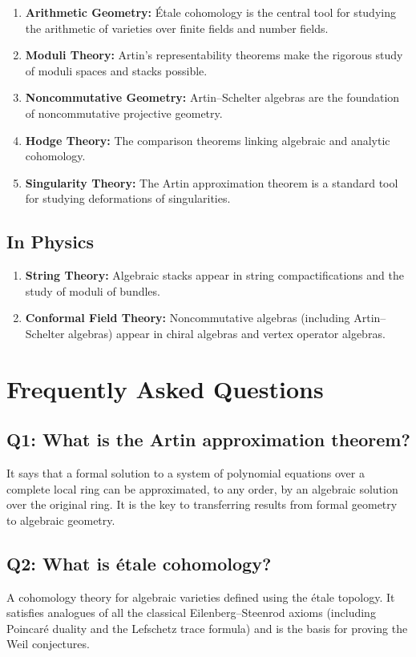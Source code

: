 \begin{enumerate}
    \item \textbf{Arithmetic Geometry:} \'Etale cohomology is the central tool for studying the arithmetic of varieties over finite fields and number fields.
    \item \textbf{Moduli Theory:} Artin's representability theorems make the rigorous study of moduli spaces and stacks possible.
    \item \textbf{Noncommutative Geometry:} Artin--Schelter algebras are the foundation of noncommutative projective geometry.
    \item \textbf{Hodge Theory:} The comparison theorems linking algebraic and analytic cohomology.
    \item \textbf{Singularity Theory:} The Artin approximation theorem is a standard tool for studying deformations of singularities.
\end{enumerate}

\subsection{In Physics}

\begin{enumerate}
    \item \textbf{String Theory:} Algebraic stacks appear in string compactifications and the study of moduli of bundles.
    \item \textbf{Conformal Field Theory:} Noncommutative algebras (including Artin--Schelter algebras) appear in chiral algebras and vertex operator algebras.
\end{enumerate}

\section{Frequently Asked Questions}

\subsection*{Q1: What is the Artin approximation theorem?}
It says that a formal solution to a system of polynomial equations over a complete local ring can be approximated, to any order, by an algebraic solution over the original ring. It is the key to transferring results from formal geometry to algebraic geometry.

\subsection*{Q2: What is \'etale cohomology?}
A cohomology theory for algebraic varieties defined using the \'etale topology. It satisfies analogues of all the classical Eilenberg--Steenrod axioms (including Poincar\'e duality and the Lefschetz trace formula) and is the basis for proving the Weil conjectures.

